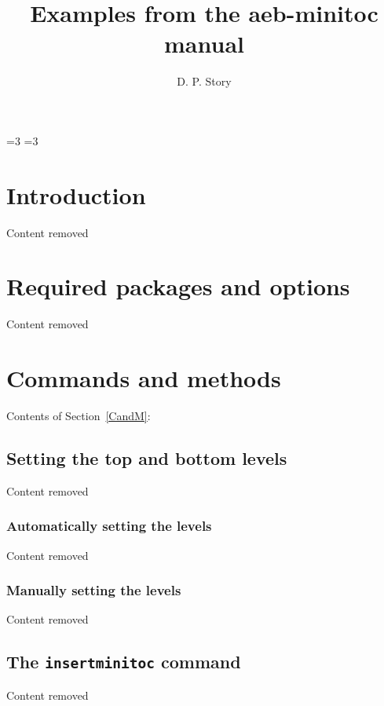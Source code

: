 \documentclass{article}
\title{Examples from the aeb-minitoc manual}
\author{D. P. Story}
\makeatletter
\def\cs#1{\texttt{\@backslashchar#1}}
\newcommand{\insMinitoci}[2][]{%
  \begin{center}#2
  \begin{minipage}[c]{0.8\linewidth}
  Contents of Section~\ref*{CandM}: \nameref*{CandM}
  \par\kern2pt
  \insertminitoc[#1]
  \end{minipage}
  \end{center}
}
\makeatother
\begin{document}
\maketitle

\bgroup
\value{secnumdepth}=3
\value{tocdepth}=3
\tableofcontents
\egroup

\newpage

\section{Introduction}

Content removed

\section{Required packages and options}

Content removed

\section{Commands and methods}

\insMinitoci{\minitocFmt}

\subsection[\protect\miniorfulltoc{\protect\textbf}{Setting the top and bottom levels}]{Setting the top and bottom levels}

Content removed

\subsubsection{Automatically setting the levels}

Content removed

\subsubsection{Manually setting the levels}

Content removed

\subsection{The \texorpdfstring{\protect\cs{insertminitoc}}{\textbackslash{insertminitoc}} command}

Content removed
\end{document}
